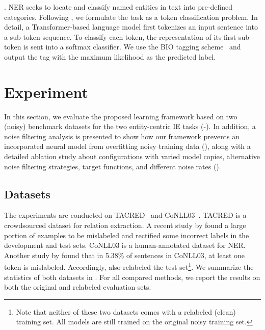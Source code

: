 \documentclass[11pt]{article}
\newcommand{\stitle}[1]{\vspace{0.3em}\noindent{\bf #1}}
\begin{document}
\stitle{Named entity recognition}. NER seeks to locate and classify named entities in text into pre-defined categories.
Following \citet{Devlin2019BERTPO}, we formulate the task as a token classification problem.
In detail, a Transformer-based language model first tokenizes an input sentence into a sub-token sequence.
To classify each token, the representation of its first sub-token is sent into a softmax classifier.
We use the BIO tagging scheme~\cite{Ramshaw1995TextCU} and output the tag with the maximum likelihood as the predicted label.

\section{Experiment}



In this section, we evaluate the proposed learning framework based on two (noisy) benchmark datasets for the two entity-centric IE tasks (-).
In addition, a noise filtering analysis is presented to show how our framework prevents an incorporated neural model from overfitting noisy training data (), along with a detailed ablation study about configurations with varied model copies, alternative noise filtering strategies, target functions, and different noise rates ().


\subsection{Datasets}\label{ssec:dataset}



The experiments are conducted on TACRED~\cite{Zhang2017PositionawareAA} and CoNLL03~\cite{Sang2003IntroductionTT}. TACRED is a crowdsourced dataset for relation extraction.
A recent study by \citet{Alt2020TACREDRA} found a large portion of examples to be mislabeled and rectified some incorrect labels in the development and test sets. CoNLL03 is a human-annotated dataset for NER.
Another study by \citet{Wang2019CrossWeighTN} found that in 5.38\% of sentences in CoNLL03, at least one token is mislabeled. 
Accordingly, \citeauthor{Wang2019CrossWeighTN} also relabeled the test set\footnote{Note that neither of these two datasets comes with a relabeled (clean) training set. All models are still trained on the original noisy training set.}.
We summarize the statistics of both datasets in .
For all compared methods, we report the results on both the original and relabeled evaluation sets.
\end{document}
